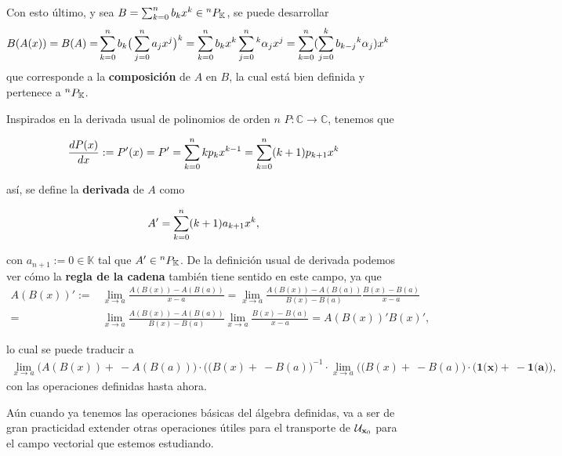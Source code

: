 Con esto último, y sea $B = \sum_{k=0}^n b_k x^k \in {^{n}P_{\mathbb{K}}}$, se puede desarrollar
\begin{align*}
 B(A(x)) = B(A) =& \sum_{k=0}^n b_k \big( \sum_{j=0}^n a_j x^j  \big)^k = \sum_{k=0}^n b_k x^k \sum_{j=0}^n {^k\alpha_j x^j} =\sum_{k=0}^n  (\sum_{j=0}^k b_{k-j} {^k\alpha_j}  )  x^k
 \end{align*}
que corresponde a la \textbf{composición} de $A$ en $B$, la cual está bien definida y pertenece a ${^{n}P_{\mathbb{K}}}$.

Inspirados en la derivada usual de polinomios de orden $n$ $P: \mathbb{C} \to \mathbb{C}$, tenemos que

\begin{align*}
 \frac{dP(x)}{dx} := P'(x) = P' = \sum_{k=0}^n{k p_k x^{k-1}} = \sum_{k=0}^n (k+1)p_{k+1} x^k 
\end{align*}

así, se define la \textbf{derivada} de $A$ como

\begin{align}
 A' = \sum_{k=0}^n (k+1)a_{k+1} x^k,
 \label{eq:polderiv}
\end{align}

con $a_{n+1} := 0 \in \mathbb{K}$ tal que $A' \in {^{n}P_{\mathbb{K}}}$. De la definición usual de derivada podemos ver cómo la \textbf{regla de la cadena} también tiene sentido en este campo, ya que 
\begin{align*}
 { A(B(x))}' :=& \lim_{x \to a}\frac{A(B(x)) - A(B(a))}{x-a} = \lim_{x \to a} \frac{A(B(x)) - A(B(a))}{B(x)-B(a)}\frac{B(x) - B(a)}{x-a}  \\
 =& \lim_{x \to a} \frac{A(B(x)) - A(B(a))}{B(x)-B(a)} \lim_{x \to a} \frac{B(x) - B(a)}{x-a} = A(B(x))'B(x)', 
\end{align*}

lo cual se puede traducir a 
\begin{align*}
\lim_{x \to a} \big( A(B(x)) + \ - A(B(a)) \big) \cdot \big( (B(x) + \ -B(a) \big)^{-1} \cdot \lim_{x \to a} \big( (B(x) + \ -B(a) \big) \cdot \big( \textbf{1(x)} + \ -\textbf{1(a)} \big),
\end{align*}
con las operaciones definidas hasta ahora.


Aún cuando ya tenemos las operaciones básicas del álgebra definidas, va a ser de gran practicidad extender otras operaciones útiles para el transporte de $\mathcal{U}_{\mathbf{x}_0}$ para el campo vectorial que estemos estudiando.

